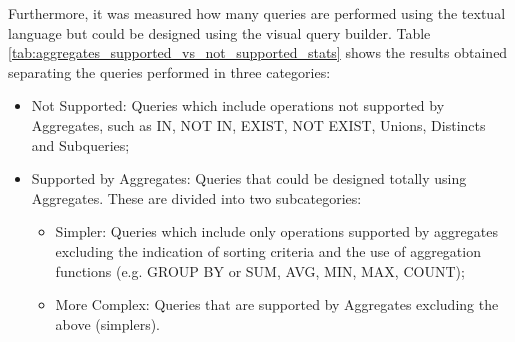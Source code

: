 
\begin{table}[tb]
	\caption{Queries that contain operations not supported by Aggregates}
	\label{tab:aggregates_operations_not_supported_stats}
\centering
{}
\end{table}

Furthermore, it was measured how many queries are performed using the textual language but could be designed using the visual query builder. Table \ref{tab:aggregates_supported_vs_not_supported_stats} shows the results obtained separating the queries performed in three categories:

\begin{itemize}
    \item Not Supported: Queries which include operations not supported by Aggregates, such as IN, NOT IN, EXIST, NOT EXIST, Unions, Distincts and Subqueries;
    \item Supported by Aggregates: Queries that could be designed totally using Aggregates. These are divided into two subcategories:
    \begin{itemize}
        \item Simpler: Queries which include only operations supported by aggregates excluding the indication of sorting criteria and the use of aggregation functions (e.g. GROUP BY or SUM, AVG, MIN, MAX, COUNT);
        \item More Complex: Queries that are supported by Aggregates excluding the above (simplers).
    \end{itemize}
\end{itemize}

